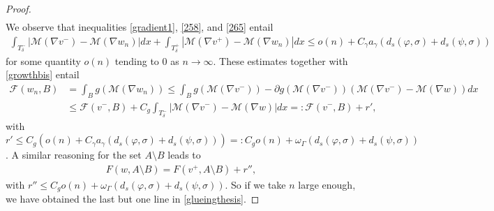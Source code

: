\documentclass[a4paper,11pt]{article}
\numberwithin{equation}{section}
\newcommand{\R}{\mathbb{R}}
\begin{document}
\begin{proof}
\begin{align}
	\end{align}
We observe that inequalities 
	\eqref{gradient1}, \eqref{258}, and \eqref{265} entail
	\begin{align*}
		\int_{T^-_\delta}|\mathcal M(\nabla v^-)-\mathcal M(\nabla w_n)|dx+\int_{T^+_\delta}|\mathcal M(\nabla v^+)-\mathcal M(\nabla w_n)|dx
		\leq o(n)+C_\gamma a_\gamma(d_s(\varphi,\sigma)+d_s(\psi,\sigma))
	\end{align*}
	for some quantity $o(n)$ tending to $0$ as $n\rightarrow\infty$. These estimates together with \eqref{growthbis} entail
	\begin{align}\label{268}
		\mathcal F(w_n,B)&=\int_Bg(\mathcal M(\nabla w_n))\leq\int_Bg(\mathcal M(\nabla v^-))-\partial g(\mathcal M(\nabla v^-))(\mathcal M(\nabla v^-)-\mathcal M(\nabla w))dx\nonumber\\
		&\leq \mathcal F(v^-,B)+C_g \int_{T_\delta^-}|\mathcal M(\nabla v^-)-\mathcal M(\nabla w)| dx=:\mathcal F(v^-,B)+r',
	\end{align} 
	with $r'\leq C_g(o(n)+C_\gamma a_\gamma(d_s(\varphi,\sigma)+d_s(\psi,\sigma))) =:C_g o(n)+\omega_\Gamma(d_s(\varphi,\sigma)+d_s(\psi,\sigma))$. A similar reasoning  for the set $A\setminus B$ leads to
	\begin{align*}
	F(w,A\setminus B)=F(v^+,A\setminus B)+r'',
	\end{align*}
with $r''\leq C_g o(n)+\omega_\Gamma(d_s(\varphi,\sigma)+d_s(\psi,\sigma))$. So if we take $n$ large enough, we have obtained the last but one line in \eqref{glueingthesis}.

\end{proof}
\end{document}
